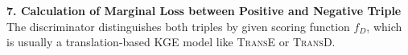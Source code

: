 \textbf{7. Calculation of Marginal Loss between Positive and Negative Triple}\\
The discriminator distinguishes both triples by given scoring function $f_D$, which is usually a translation-based \ac{KGE} model like \textsc{TransE} or \textsc{TransD}.